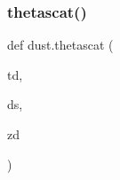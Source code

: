 \mbox{\label{namespacedust_a68eab447dbb0803f6d41e20b4d6beab8}} 
\subsubsection{\texorpdfstring{thetascat()}{thetascat()}}
{\footnotesize\ttfamily def dust.\+thetascat (\begin{DoxyParamCaption}\item[{}]{td,  }\item[{}]{ds,  }\item[{}]{zd }\end{DoxyParamCaption})}


